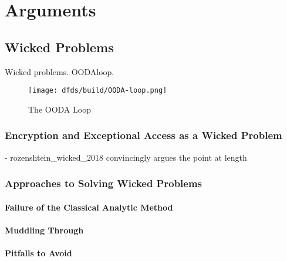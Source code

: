 \chapter{Arguments}
\label{chap-arguments}

\section{Wicked Problems}

Wicked problems. \ac{OODAloop}.

\begin{figure}[h]
    \centering\CaptionFontSize
    \texttt{[image: dfds/build/OODA-loop.png]}
    \caption[The OODA Loop]{The OODA Loop}
    \label{fig-ooda-loop}
\end{figure}

\subsection{Encryption and Exceptional Access as a Wicked Problem}

- rozenshtein_wicked_2018 convincingly argues the point at length

\subsection{Approaches to Solving Wicked Problems}

\subsubsection{Failure of the Classical Analytic Method}

\subsubsection{Muddling Through}


\subsubsection{Pitfalls to Avoid}

